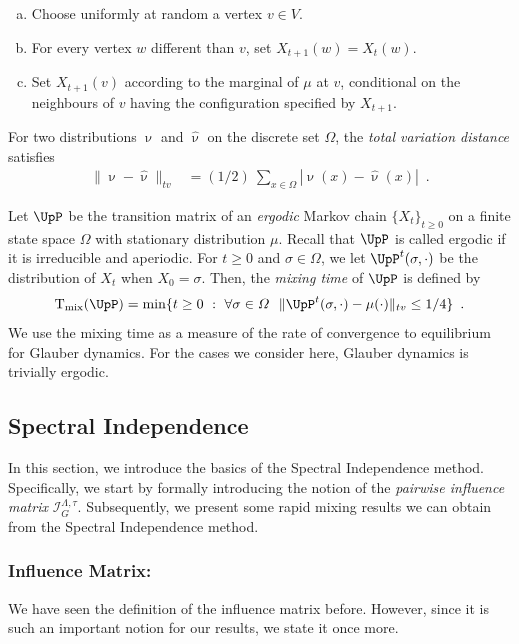 \documentclass[11pt,reqno]{amsart}
\numberwithin{equation}{section}
\newcommand{\cI}{{\mathcal{I}}}
\newcommand{\blue}[1]{{\color{blue}#1}}
\newcommand{\cadmiumorange}[1]{{\color{cadmiumorange}#1}}
\newcommand{\electricviolet}[1]{{\color{electricviolet}#1}}
\newcommand{\goldenbrown}[1]{{\color{goldenbrown}#1}}
\newcommand{\heliotrope}[1]{{\color{heliotrope}#1}}
\newcommand{\Glauber}{{\{X_{\kt}\}_{\kt\geq 0}}}
\newcommand{\infmatrix}{\cI}
\newcommand{\norm}[2]{\goldenbrown{\|} #1 \goldenbrown{\|}_{#2}}
\newcommand{\tv}{tv}
\newcommand{\abs}[1]{\blue{|}#1\blue{|}}
\renewcommand{\blue}[1]{#1}
\renewcommand{\cadmiumorange}[1]{#1}
\renewcommand{\electricviolet}[1]{#1}
\renewcommand{\goldenbrown}[1]{#1}
\renewcommand{\heliotrope}[1]{#1}
\newcommand{\kt}{\cadmiumorange{t}}
\newcommand{\kv}{\electricviolet{v}}
\newcommand{\kw}{\blue{w}}
\newcommand{\kx}{\heliotrope{x}}
\renewcommand{\kt}{t}
\renewcommand{\kv}{v}
\renewcommand{\kw}{w}
\renewcommand{\kx}{x}
\begin{document}
\begin{enumerate}[(a)]
%
\item Choose uniformly at random a vertex $\kv\in V$. 
%
\item For every vertex $\kw$ different than $\kv$, set $X_{\kt+1}(\kw)=X_{\kt}(\kw)$.
% 
\item Set $X_{\kt+1}(\kv)$ according to the marginal of $\mu$ at $\kv$, conditional on 
the neighbours of $\kv$ having the configuration specified by $X_{t+1}$.
\end{enumerate}


% 
For two distributions $\upnu$ and $\hat{\upnu}$ on the discrete set $\Omega$,
the {\em total variation distance} satisfies 
\begin{align}\nonumber %
\norm{\upnu-\hat{\upnu}}{\tv} &=(1/{2}) \ { \sum\nolimits_{\kx\in \Omega} }\abs{\upnu(\kx)-\hat{\upnu}(\kx)} \enspace .
\end{align}
%

Let $\UpP$ be the transition matrix of an {\em ergodic} Markov chain $\Glauber$ on a finite state space
$\Omega$ with stationary distribution $\mu$. Recall that $\UpP$ is called ergodic if it is irreducible and aperiodic. 
%
For $\kt\geq 0$ and $\sigma\in \Omega$, we let $\UpP^{\kt}(\sigma, \cdot)$  be the distribution of $X_{\kt}$ when $X_0=\sigma$. Then, the {\em mixing time} of $\UpP$ is defined by 
\begin{align}\nonumber 
{\rm T}_{\rm mix}(\UpP)=\min\{\kt\geq 0\ :\ \forall \sigma\in \Omega \ \ \norm{\UpP^{\kt}(\sigma, \cdot)-\mu(\cdot)}{\tv}\leq 1/4\} \enspace.
\end{align}
We use the mixing time as a measure of the rate of convergence to equilibrium for Glauber dynamics.
For the cases we consider here, Glauber dynamics is trivially ergodic. 


\subsection{Spectral Independence}\label{sec:SIPrelimIntro}
%
In this section, we introduce the  basics of the Spectral Independence method. Specifically, we start by formally
introducing the notion of the {\em pairwise influence matrix} $\infmatrix^{\Lambda,\tau}_{G}$. Subsequently, we 
present  some rapid mixing results  we can obtain from the Spectral Independence method. 

\subsubsection*{Influence Matrix:}
We have seen the definition of the influence matrix before. However, since it is such an important  notion for 
our  results, we state it once more. 
\end{document}
